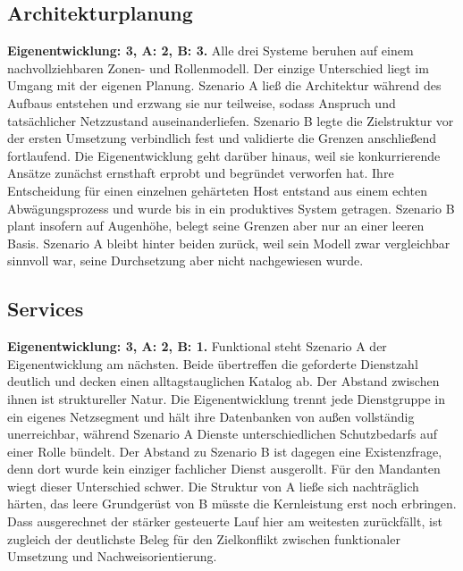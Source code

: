 \subsection{Architekturplanung}
\textbf{Eigenentwicklung: 3, A: 2, B: 3.} Alle drei Systeme beruhen auf einem nachvollziehbaren Zonen- und Rollenmodell. Der einzige Unterschied liegt im Umgang mit der eigenen Planung. 
Szenario A ließ die Architektur während des Aufbaus entstehen und erzwang sie nur teilweise, sodass Anspruch und tatsächlicher Netzzustand auseinanderliefen. 
Szenario B legte die Zielstruktur vor der ersten Umsetzung verbindlich fest und validierte die Grenzen anschließend fortlaufend. 
Die Eigenentwicklung geht darüber hinaus, weil sie konkurrierende Ansätze zunächst ernsthaft erprobt und begründet verworfen hat. Ihre Entscheidung für einen einzelnen gehärteten Host entstand aus einem echten
Abwägungsprozess und wurde bis in ein produktives System getragen. 
Szenario B plant insofern auf Augenhöhe, belegt seine Grenzen aber nur an einer leeren Basis.
Szenario A bleibt hinter beiden zurück, weil sein Modell zwar vergleichbar sinnvoll war, seine Durchsetzung aber nicht nachgewiesen wurde.\cite{runbookA,selfauditA,masterplanB,validatornotesB}

\subsection{Services}
\textbf{Eigenentwicklung: 3, A: 2, B: 1.} Funktional steht Szenario A der Eigenentwicklung am nächsten. Beide übertreffen die geforderte Dienstzahl deutlich und decken einen alltagstauglichen Katalog ab. Der Abstand zwischen ihnen ist struktureller Natur. 
Die Eigenentwicklung trennt jede Dienstgruppe in ein eigenes Netzsegment und hält ihre Datenbanken von außen vollständig unerreichbar, während Szenario A Dienste unterschiedlichen Schutzbedarfs auf
einer Rolle bündelt. 
Der Abstand zu Szenario B ist dagegen eine Existenzfrage, denn dort wurde kein einziger fachlicher Dienst ausgerollt. 
Für den Mandanten wiegt dieser Unterschied schwer. Die Struktur von A ließe sich nachträglich
härten, das leere Grundgerüst von B müsste die Kernleistung erst noch erbringen. Dass ausgerechnet der stärker gesteuerte Lauf hier am weitesten zurückfällt, ist zugleich der deutlichste Beleg für den Zielkonflikt zwischen funktionaler Umsetzung und Nachweisorientierung.\cite{runbookA,masterplanB,finalsummaryB}

